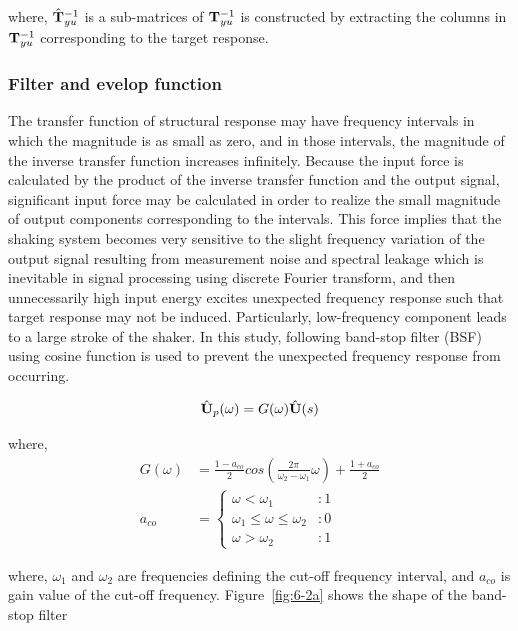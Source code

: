 where, $\hat{\mathbf{T}}_{yu}^{-1}$ is a sub-matrices of $\mathbf{T}_{yu}^{-1}$ is constructed by extracting the columns in $\mathbf{T}_{yu}^{-1}$ corresponding to the target response.

\subsubsection{Filter and evelop function}
The transfer function of structural response may have frequency intervals in which the magnitude is as small as zero, and in those intervals, the magnitude of the inverse transfer function increases infinitely. Because the input force is calculated by the product of the inverse transfer function and the output signal, significant input force may be calculated in order to realize the small magnitude of output components corresponding to the intervals. This force implies that the shaking system becomes very sensitive to the slight frequency variation of the output signal resulting from measurement noise and spectral leakage which is inevitable in signal processing using discrete Fourier transform, and then unnecessarily high input energy excites unexpected frequency response such that target response may not be induced. Particularly, low-frequency component leads to a large stroke of the shaker. In this study, following band-stop filter (BSF) using cosine function is used to prevent the unexpected frequency response from occurring.

\begin{equation}\label{eq:6-5}
\hat{\mathbf{U}}_{p}(\omega) = G(\omega)\hat{\mathbf{U}}(s)
\end{equation}

where,
\begin{align}
G(\omega) &= \frac{1-a_{co}}{2}cos \left( \frac{2\pi}{\omega_{2}-\omega_{1}}\omega \right) + \frac{1+a_{co}}{2}\label{eq:6-6}\\
a_{co} &=\left\{\begin{array}{lr} \omega < \omega_{1} &: 1 \\ \omega_{1} \leq \omega \leq \omega_{2} &: 0 \\ \omega > \omega_{2} &: 1\end{array} \right.
\label{eq:6-7}
\end{align}

where, $\omega_{1}$ and $\omega_{2}$ are frequencies defining the cut-off frequency interval, and $a_{co}$ is gain value of the cut-off frequency. Figure~\ref{fig:6-2a} shows the shape of the band-stop filter


